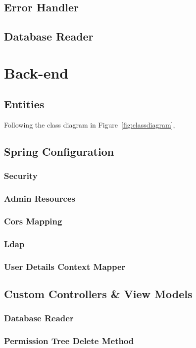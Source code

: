 \subsection{Error Handler}
\subsection{Database Reader}

\section{Back-end}\label{cha:implementation:sec:back-end}

\subsection{Entities}
Following the class diagram in Figure~\ref{fig:classdiagram}, 
\subsection{Spring Configuration}
\subsubsection{Security}
\subsubsection{Admin Resources}
\subsubsection{Cors Mapping}
\subsubsection{Ldap}
\subsubsection{User Details Context Mapper}
\subsection{Custom Controllers \& View Models}
\subsubsection{Database Reader}
\subsubsection{Permission Tree Delete Method}
